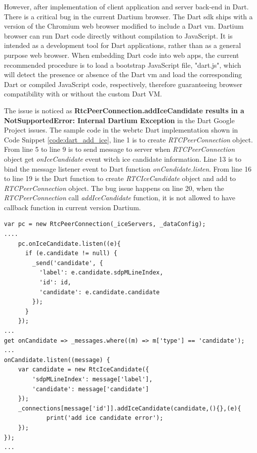 \par However, after implementation of client application and server back-end in Dart. There is a critical bug in the current Dartium browser. The Dart \gls{sdk} ships with a version of the Chromium web browser modified to include a Dart \gls{vm}. Dartium browser can run Dart code directly without compilation to JavaScript. It is intended as a development tool for Dart applications, rather than as a general purpose web browser. When embedding Dart code into web apps, the current recommended procedure is to load a bootstrap JavaScript file, "dart.js", which will detect the presence or absence of the Dart \gls{vm} and load the corresponding Dart or compiled JavaScript code, respectively, therefore guaranteeing browser compatibility with or without the custom Dart VM.\cite{wiki:dart} 
\par The issue is noticed as \textbf{RtcPeerConnection.addIceCandidate results in a NotSupportedError: Internal Dartium Exception} in the Dart Google Project issues.\cite{bug:dartium} The sample code in the \gls{webrtc} Dart implementation shown in Code Snippet \ref{code:dart_add_ice}, line 1 is to create \textit{RTCPeerConnection} object. From line 5 to line 9 is to send message to server when \textit{RTCPeerConnection} object get \textit{onIceCandidate} event witch \gls{ice} candidate information. Line 13 is to bind the message listener event to Dart function \textit{onCandidate.listen}. From line 16 to line 19 is the Dart function to create \textit{RTCIceCandidate} object and add to \textit{RTCPeerConnection} object. The bug issue happens on line 20, when the \textit{RTCPeerConnection} call \textit{addIceCandidate} function, it is not allowed to have callback function in current version Dartium.

\begin{lstlisting}[caption={Add IceCandidate in Dart},label={code:dart_add_ice}]
var pc = new RtcPeerConnection(_iceServers, _dataConfig);
....
    pc.onIceCandidate.listen((e){
      if (e.candidate != null) {
        _send('candidate', {
          'label': e.candidate.sdpMLineIndex,
          'id': id,
          'candidate': e.candidate.candidate
        });
      }
    });
...
get onCandidate => _messages.where((m) => m['type'] == 'candidate');
...
onCandidate.listen((message) {
	var candidate = new RtcIceCandidate({
		'sdpMLineIndex': message['label'],
        'candidate': message['candidate']
    });
    _connections[message['id']].addIceCandidate(candidate,(){},(e){
    		print('add ice candidate error');
    });
});
...
\end{lstlisting}

